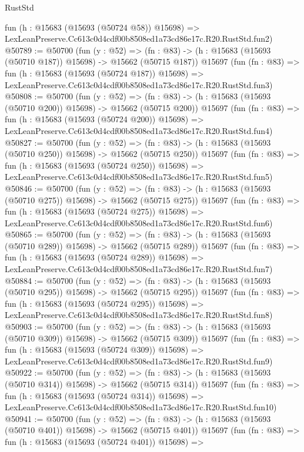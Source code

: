 \begin{lexlean}{RustStd}
\begin{coremodule}
    fun (h : @15683 (@15693 (@50724 @58)) @15698) =>
    LexLeanPreserve.Cc613c0d4cdf00b8508ed1a73cd86e17c.R20.RustStd.fun2)
@50789 := @50700
    (fun (y : @52) =>
    (fn : @83) -> (h : @15683 (@15693 (@50710 @187)) @15698) -> @15662 (@50715 @187))
    @15697
    (fun (fn : @83) =>
    fun (h : @15683 (@15693 (@50724 @187)) @15698) =>
    LexLeanPreserve.Cc613c0d4cdf00b8508ed1a73cd86e17c.R20.RustStd.fun3)
@50808 := @50700
    (fun (y : @52) =>
    (fn : @83) -> (h : @15683 (@15693 (@50710 @200)) @15698) -> @15662 (@50715 @200))
    @15697
    (fun (fn : @83) =>
    fun (h : @15683 (@15693 (@50724 @200)) @15698) =>
    LexLeanPreserve.Cc613c0d4cdf00b8508ed1a73cd86e17c.R20.RustStd.fun4)
@50827 := @50700
    (fun (y : @52) =>
    (fn : @83) -> (h : @15683 (@15693 (@50710 @250)) @15698) -> @15662 (@50715 @250))
    @15697
    (fun (fn : @83) =>
    fun (h : @15683 (@15693 (@50724 @250)) @15698) =>
    LexLeanPreserve.Cc613c0d4cdf00b8508ed1a73cd86e17c.R20.RustStd.fun5)
@50846 := @50700
    (fun (y : @52) =>
    (fn : @83) -> (h : @15683 (@15693 (@50710 @275)) @15698) -> @15662 (@50715 @275))
    @15697
    (fun (fn : @83) =>
    fun (h : @15683 (@15693 (@50724 @275)) @15698) =>
    LexLeanPreserve.Cc613c0d4cdf00b8508ed1a73cd86e17c.R20.RustStd.fun6)
@50865 := @50700
    (fun (y : @52) =>
    (fn : @83) -> (h : @15683 (@15693 (@50710 @289)) @15698) -> @15662 (@50715 @289))
    @15697
    (fun (fn : @83) =>
    fun (h : @15683 (@15693 (@50724 @289)) @15698) =>
    LexLeanPreserve.Cc613c0d4cdf00b8508ed1a73cd86e17c.R20.RustStd.fun7)
@50884 := @50700
    (fun (y : @52) =>
    (fn : @83) -> (h : @15683 (@15693 (@50710 @295)) @15698) -> @15662 (@50715 @295))
    @15697
    (fun (fn : @83) =>
    fun (h : @15683 (@15693 (@50724 @295)) @15698) =>
    LexLeanPreserve.Cc613c0d4cdf00b8508ed1a73cd86e17c.R20.RustStd.fun8)
@50903 := @50700
    (fun (y : @52) =>
    (fn : @83) -> (h : @15683 (@15693 (@50710 @309)) @15698) -> @15662 (@50715 @309))
    @15697
    (fun (fn : @83) =>
    fun (h : @15683 (@15693 (@50724 @309)) @15698) =>
    LexLeanPreserve.Cc613c0d4cdf00b8508ed1a73cd86e17c.R20.RustStd.fun9)
@50922 := @50700
    (fun (y : @52) =>
    (fn : @83) -> (h : @15683 (@15693 (@50710 @314)) @15698) -> @15662 (@50715 @314))
    @15697
    (fun (fn : @83) =>
    fun (h : @15683 (@15693 (@50724 @314)) @15698) =>
    LexLeanPreserve.Cc613c0d4cdf00b8508ed1a73cd86e17c.R20.RustStd.fun10)
@50941 := @50700
    (fun (y : @52) =>
    (fn : @83) -> (h : @15683 (@15693 (@50710 @401)) @15698) -> @15662 (@50715 @401))
    @15697
    (fun (fn : @83) =>
    fun (h : @15683 (@15693 (@50724 @401)) @15698) =>

\end{coremodule}
\end{lexlean}
